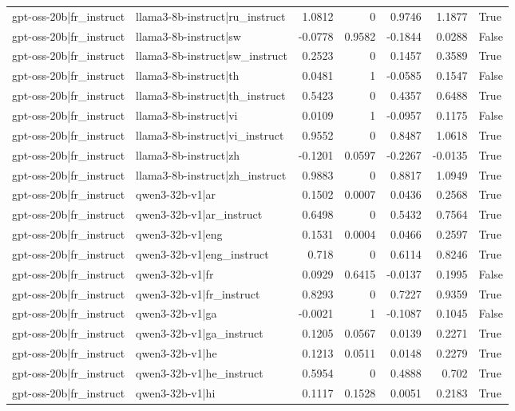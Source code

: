 \begin{table}
\begin{tabular}{l l r r r r l}
gpt-oss-20b|fr_instruct & llama3-8b-instruct|ru_instruct & 1.0812 & 0 & 0.9746 & 1.1877 & True \\
gpt-oss-20b|fr_instruct & llama3-8b-instruct|sw & -0.0778 & 0.9582 & -0.1844 & 0.0288 & False \\
gpt-oss-20b|fr_instruct & llama3-8b-instruct|sw_instruct & 0.2523 & 0 & 0.1457 & 0.3589 & True \\
gpt-oss-20b|fr_instruct & llama3-8b-instruct|th & 0.0481 & 1 & -0.0585 & 0.1547 & False \\
gpt-oss-20b|fr_instruct & llama3-8b-instruct|th_instruct & 0.5423 & 0 & 0.4357 & 0.6488 & True \\
gpt-oss-20b|fr_instruct & llama3-8b-instruct|vi & 0.0109 & 1 & -0.0957 & 0.1175 & False \\
gpt-oss-20b|fr_instruct & llama3-8b-instruct|vi_instruct & 0.9552 & 0 & 0.8487 & 1.0618 & True \\
gpt-oss-20b|fr_instruct & llama3-8b-instruct|zh & -0.1201 & 0.0597 & -0.2267 & -0.0135 & True \\
gpt-oss-20b|fr_instruct & llama3-8b-instruct|zh_instruct & 0.9883 & 0 & 0.8817 & 1.0949 & True \\
gpt-oss-20b|fr_instruct & qwen3-32b-v1|ar & 0.1502 & 0.0007 & 0.0436 & 0.2568 & True \\
gpt-oss-20b|fr_instruct & qwen3-32b-v1|ar_instruct & 0.6498 & 0 & 0.5432 & 0.7564 & True \\
gpt-oss-20b|fr_instruct & qwen3-32b-v1|eng & 0.1531 & 0.0004 & 0.0466 & 0.2597 & True \\
gpt-oss-20b|fr_instruct & qwen3-32b-v1|eng_instruct & 0.718 & 0 & 0.6114 & 0.8246 & True \\
gpt-oss-20b|fr_instruct & qwen3-32b-v1|fr & 0.0929 & 0.6415 & -0.0137 & 0.1995 & False \\
gpt-oss-20b|fr_instruct & qwen3-32b-v1|fr_instruct & 0.8293 & 0 & 0.7227 & 0.9359 & True \\
gpt-oss-20b|fr_instruct & qwen3-32b-v1|ga & -0.0021 & 1 & -0.1087 & 0.1045 & False \\
gpt-oss-20b|fr_instruct & qwen3-32b-v1|ga_instruct & 0.1205 & 0.0567 & 0.0139 & 0.2271 & True \\
gpt-oss-20b|fr_instruct & qwen3-32b-v1|he & 0.1213 & 0.0511 & 0.0148 & 0.2279 & True \\
gpt-oss-20b|fr_instruct & qwen3-32b-v1|he_instruct & 0.5954 & 0 & 0.4888 & 0.702 & True \\
gpt-oss-20b|fr_instruct & qwen3-32b-v1|hi & 0.1117 & 0.1528 & 0.0051 & 0.2183 & True \\

\end{tabular}
\end{table}
